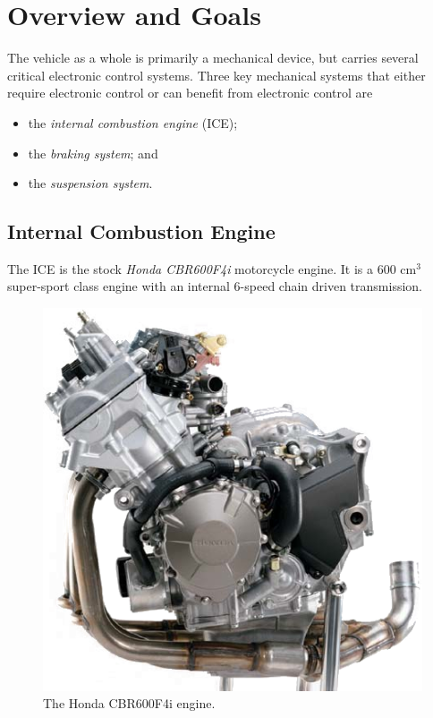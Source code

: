 %
%
%
%

\chapter{Overview and Goals}

The vehicle as a whole is primarily a mechanical device, but carries several critical electronic control systems. Three key mechanical systems that either require electronic control or can benefit from electronic control are

\begin{itemize}
\item the \emph{internal combustion engine} (ICE); 
\item the \emph{braking system}; and
\item the \emph{suspension system}.
\end{itemize}

\section{Internal Combustion Engine}
\label{sec:ice_overview}


The ICE is the stock \emph{Honda CBR600F4i} motorcycle engine. It is a 600 cm$^3$ super-sport class engine with an internal 6-speed chain driven transmission. 

\begin{figure}[H]
	\centering
	 	\includegraphics[scale=0.5]{figures/cbr600f4i_engine.png}
    \caption{The Honda CBR600F4i engine.}
    \label{fig:cbr600f4i_engine}
\end{figure}

